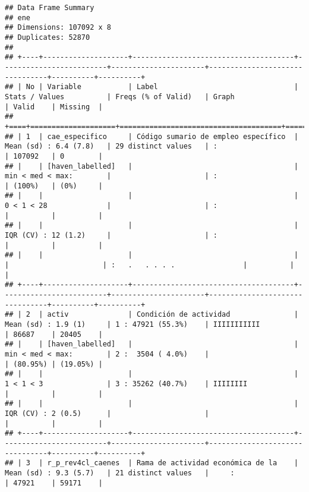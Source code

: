 \documentclass[]{article}
\begin{document}
\begin{verbatim}
## Data Frame Summary  
## ene  
## Dimensions: 107092 x 8  
## Duplicates: 52870  
## 
## +----+--------------------+--------------------------------------+-------------------------+----------------------+--------------------------------+----------+----------+
## | No | Variable           | Label                                | Stats / Values          | Freqs (% of Valid)   | Graph                          | Valid    | Missing  |
## +====+====================+======================================+=========================+======================+================================+==========+==========+
## | 1  | cae_especifico     | Código sumario de empleo específico  | Mean (sd) : 6.4 (7.8)   | 29 distinct values   | :                              | 107092   | 0        |
## |    | [haven_labelled]   |                                      | min < med < max:        |                      | :                              | (100%)   | (0%)     |
## |    |                    |                                      | 0 < 1 < 28              |                      | :                              |          |          |
## |    |                    |                                      | IQR (CV) : 12 (1.2)     |                      | :                              |          |          |
## |    |                    |                                      |                         |                      | :   .   . . . .                |          |          |
## +----+--------------------+--------------------------------------+-------------------------+----------------------+--------------------------------+----------+----------+
## | 2  | activ              | Condición de actividad               | Mean (sd) : 1.9 (1)     | 1 : 47921 (55.3%)    | IIIIIIIIIII                    | 86687    | 20405    |
## |    | [haven_labelled]   |                                      | min < med < max:        | 2 :  3504 ( 4.0%)    |                                | (80.95%) | (19.05%) |
## |    |                    |                                      | 1 < 1 < 3               | 3 : 35262 (40.7%)    | IIIIIIII                       |          |          |
## |    |                    |                                      | IQR (CV) : 2 (0.5)      |                      |                                |          |          |
## +----+--------------------+--------------------------------------+-------------------------+----------------------+--------------------------------+----------+----------+
## | 3  | r_p_rev4cl_caenes  | Rama de actividad económica de la    | Mean (sd) : 9.3 (5.7)   | 21 distinct values   |     :                          | 47921    | 59171    |

\end{verbatim}
\end{document}

